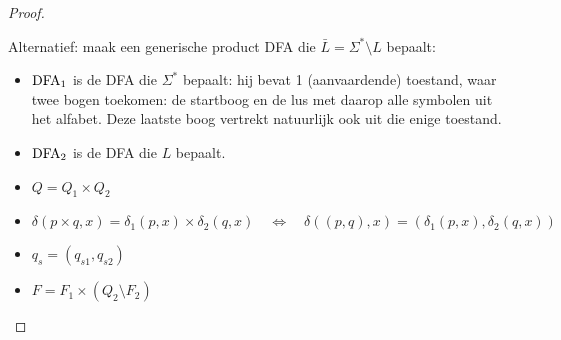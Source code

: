 \documentclass[../aanvullingen_cursus.tex]{subfiles}
\begin{document}
\begin{proof}
\begin{itemize}
		Alternatief: maak een generische product DFA die \(\bar{L}=\Sigma^*\setminus L \) bepaalt:
		\begin{itemize}
			\item \(\text{DFA}_1\) is de DFA die \(\Sigma^*\) bepaalt: hij bevat 1 (aanvaardende) toestand, waar twee bogen toekomen: de startboog en de lus met daarop alle symbolen uit het alfabet. Deze laatste boog vertrekt natuurlijk ook uit die enige toestand.
			\item \(\text{DFA}_2\) is de DFA die \(L\) bepaalt.
			\item \(Q=Q_1 \times Q_2\)
			\item \(\delta(p \times q, x)=\delta_1(p,x) \times \delta_2(q,x) \quad \Leftrightarrow \quad
			\delta\left((p,q), x\right)=\left(\delta_1(p,x), \delta_2(q,x)\right)\)
			\item \(q_s = (q_{s1},q_{s2})\)
			\item \(F = F_1 \times (Q_2 \setminus F_2)\)
		\end{itemize}
	\end{itemize}
\end{proof}
\end{document}

